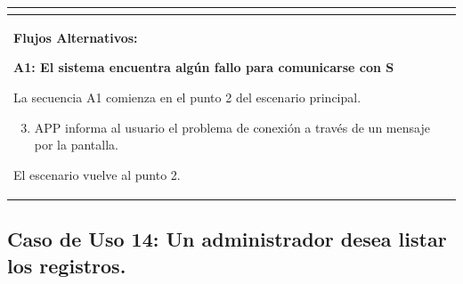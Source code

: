 \begin{longtable}{|l|p{5.5cm}|l|p{2cm}|l|p{1.9cm}|}
{    } \\ \hline

    \multicolumn{6}{|p{15cm}|}{ \textbf{Flujos Alternativos: }
    
    \textbf{A1: El sistema encuentra algún fallo para comunicarse con S}
    
    La secuencia A1 comienza en el punto 2 del escenario principal.
    \begin{enumerate}
        \setcounter{enumi}{2}
        \item APP informa al usuario el problema de conexión a través de un mensaje por la pantalla.
    \end{enumerate}

    El escenario vuelve al punto 2.

    } \\ \hline

\end{longtable}

\subsection{Caso de Uso 14: Un administrador desea listar los registros.}

